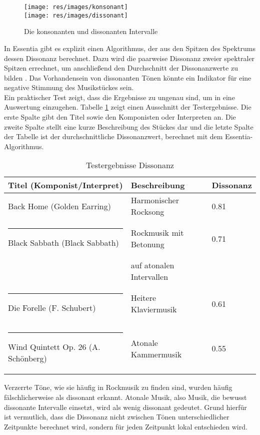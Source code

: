 \documentclass[11pt,a4paper]{article}
\begin{document}
\begin{figure}[ht]
\texttt{[image: res/images/konsonant]}
\vspace{5pt}\\
\texttt{[image: res/images/dissonant]}
\caption[Konsonante und Dissonante Intervalle]{Die konsonanten und dissonanten Intervalle \cite{89a5aac0af37ff45f55cd59468ed3b0a5f30cbb229bb691b7970477c14dbe1af}}
\label{fig:KonDisIntervalle}
\end{figure}
\noindent
In Essentia gibt es explizit einen Algorithmus, der aus den Spitzen des Spektrums dessen Dissonanz berechnet. Dazu wird die paarweise Dissonanz zweier spektraler Spitzen errechnet, um anschließend den Durchschnitt der Dissonanzwerte zu bilden \cite{EssentiaDissonance}. Das Vorhandensein von dissonanten Tönen könnte ein Indikator für eine negative Stimmung des Musikstückes sein.\\
Ein praktischer Test zeigt, dass die Ergebnisse zu ungenau sind, um in eine Auswertung einzugehen. Tabelle \ref{tab:DissonanzTestergebnisse} zeigt einen Ausschnitt der Testergebnisse. Die erste Spalte gibt den Titel sowie den Komponisten oder Interpreten an. Die zweite Spalte stellt eine kurze Beschreibung des Stückes dar und die letzte Spalte der Tabelle ist der durchschnittliche Dissonanzwert, berechnet mit dem Essentia-Algorithmus.
\begin{center}
\begin{table}[!ht]
\begin{tabular}{l | l | l}
\textbf{Titel (Komponist/Interpret)} & \textbf{Beschreibung} & \textbf{Dissonanz} \\
\hline
Back Home (Golden Earring) & Harmonischer Rocksong & 0.81 \\
\rule{-3pt}{3ex}
Black Sabbath (Black Sabbath) & Rockmusik mit Betonung & 0.71 \\
 &  auf atonalen Intervallen & \\
 \rule{-3pt}{3ex}
Die Forelle (F. Schubert) & Heitere Klaviermusik & 0.61 \\
\rule{-3pt}{3ex}
Wind Quintett Op. 26 (A. Schönberg) & Atonale Kammermusik & 0.55 \\
\end{tabular}
\caption[Testergebnisse Dissonanz]{Testergebnisse Dissonanz}
\label{tab:DissonanzTestergebnisse}
\end{table}
\end{center}
\noindent
Verzerrte Töne, wie sie häufig in Rockmusik zu finden sind, wurden häufig fälschlicherweise als dissonant erkannt. Atonale Musik, also Musik, die bewusst dissonante Intervalle einsetzt, wird als wenig dissonant gedeutet. Grund hierfür ist vermutlich, dass die Dissonanz nicht zwischen Tönen unterschiedlicher Zeitpunkte berechnet wird, sondern für jeden Zeitpunkt lokal entschieden wird.
\end{document}
